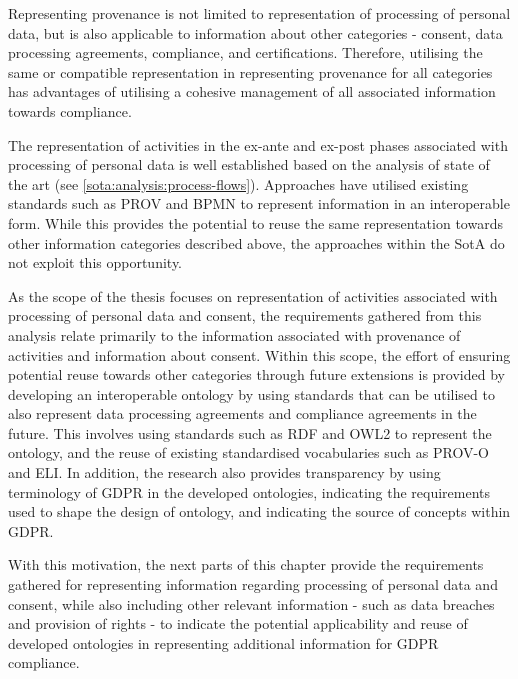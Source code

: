 Representing provenance is not limited to representation of processing of personal data, but is also applicable to information about other categories - consent, data processing agreements, compliance, and certifications. Therefore, utilising the same or compatible representation in representing provenance for all categories has advantages of utilising a cohesive management of all associated information towards compliance.

The representation of activities in the ex-ante and ex-post phases associated with processing of personal data is well established based on the analysis of state of the art (see \autoref{sota:analysis:process-flows}). 
Approaches have utilised existing standards such as PROV and BPMN to represent information in an interoperable form. 
While this provides the potential to reuse the same representation towards other information categories described above, the approaches within the SotA do not exploit this opportunity.

As the scope of the thesis focuses on representation of activities associated with processing of personal data and consent, the requirements gathered from this analysis relate primarily to the information associated with provenance of activities and information about consent.
Within this scope, the effort of ensuring potential reuse towards other categories through future extensions is provided by developing an interoperable ontology by using standards that can be utilised to also represent data processing agreements and compliance agreements in the future.
This involves using standards such as RDF and OWL2 to represent the ontology, and the reuse of existing standardised vocabularies such as PROV-O and ELI.
In addition, the research also provides transparency by using terminology of GDPR in the developed ontologies, indicating the requirements used to shape the design of ontology, and indicating the source of concepts within GDPR.

With this motivation, the next parts of this chapter provide the requirements gathered for representing information regarding processing of personal data and consent, while also including other relevant information - such as data breaches and provision of rights - to indicate the potential applicability and reuse of developed ontologies in representing additional information for GDPR compliance.

